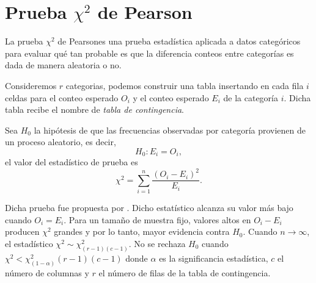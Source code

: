 
\chapter{Prueba $\chi^2$ de Pearson}
\label{apchitest}

La prueba $\chi^2$ de Pearsones una prueba estadística aplicada a datos categóricos para evaluar qué tan probable es que la diferencia conteos entre categorías es dada de manera aleatoria o no.

Consideremos $r$ categorias, podemos construir una tabla insertando en cada fila $i$ celdas para el conteo esperado $O_{i}$ y el conteo esperado $E_i$ de la categoría $i$. Dicha tabla recibe el nombre de \textit{tabla de contingencia}.

Sea $H_0$ la hipótesis de que las frecuencias observadas por categoría provienen de un proceso aleatorio, es decir,
\begin{equation}
 H_0: E_{i}=O_i, 
\end{equation}
el valor del estadístico de prueba es
\begin{equation}
\chi^2 = \sum_{i=1}^n \dfrac{\left( O_i-E_i \right)^2}{E_i}.
\end{equation}

Dicha prueba fue propuesta por \citet{pearson90}. Dicho estatístico alcanza su valor más bajo cuando $O_i=E_i$. Para un tamaño de muestra fijo, valores altos en $O_i-E_i$ producen $\chi^2$ grandes y por lo tanto, mayor evidencia contra $H_0$. Cuando $n\rightarrow \infty$, el estadístico $\chi^2 \sim \chi^2_{(r-1)(c-1)}$.
No se rechaza $H_0$ cuando $\chi^2 < \chi^2_{(1-\alpha)} {(r-1)(c-1)}$  donde $\alpha$ es la significancia estadística, $c$ el número de columnas  y $r$ el número de filas de la tabla de contingencia.







